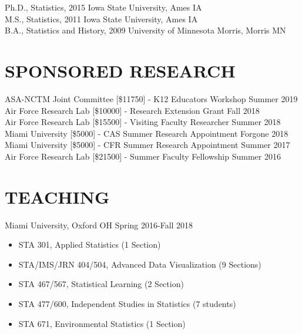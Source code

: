 \documentclass[margin, 10pt]{res}\usepackage[]{graphicx}\usepackage[]{color}
\begin{document}
\begin{resume}
Ph.D., Statistics, 2015 \hfill Iowa State University, Ames IA  \\
M.S., Statistics, 2011 \hfill  Iowa State University, Ames IA  \\ 
B.A., Statistics and History, 2009 \hfill  University of Minnesota Morris, Morris MN 


  
  \section{SPONSORED RESEARCH}

ASA-NCTM Joint Committee [\$11750] - K12 Educators Workshop \hfill Summer 2019 \\
Air Force Research Lab [\$10000] - Research Extension Grant \hfill Fall 2018\\
Air Force Research Lab [\$15500] - Visiting Faculty Researcher \hfill Summer 2018 \\
Miami University [\$5000] - CAS Summer Research Appointment  \hfill Forgone 2018 \\
Miami University [\$5000] - CFR Summer Research Appointment  \hfill Summer 2017 \\
Air Force Research Lab [\$21500] - Summer Faculty Fellowship  \hfill Summer 2016 

  
  \section{TEACHING}

Miami University, Oxford OH \hfill  Spring 2016-Fall 2018
\begin{itemize} \itemsep -2pt %
\item STA 301, Applied Statistics (1 Section)
\item STA/IMS/JRN 404/504, Advanced Data Visualization (9 Sections)
\item STA 467/567, Statistical Learning (2 Section)
\item STA 477/600, Independent Studies in Statistics (7 students)
\item STA 671, Environmental Statistics  (1 Section)
\end{itemize}


\end{resume}
\end{document}
